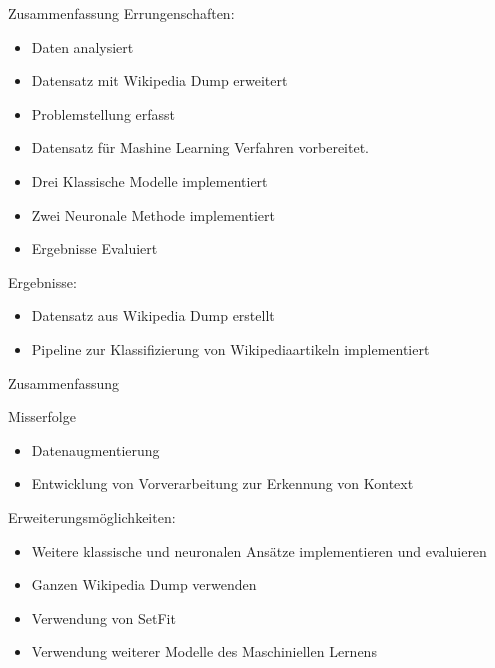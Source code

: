 \documentclass[aspectratio=169]{beamer} %
\begin{document}
\begin{frame}
\begin{block}{Zusammenfassung}
Errungenschaften:
\begin{itemize}
\item Daten analysiert
\item Datensatz mit Wikipedia Dump erweitert
\item Problemstellung erfasst
\item Datensatz für Mashine Learning Verfahren vorbereitet.
\item Drei Klassische Modelle implementiert
\item Zwei Neuronale Methode implementiert
\item Ergebnisse Evaluiert
\end{itemize}
Ergebnisse:
\begin{itemize}
\item Datensatz aus Wikipedia Dump erstellt
\item Pipeline zur Klassifizierung von Wikipediaartikeln implementiert
\end{itemize}
\end{block}
\end{frame}
\begin{frame}

\begin{block}{Zusammenfassung}

Misserfolge
\begin{itemize}
\item Datenaugmentierung
\item Entwicklung von Vorverarbeitung zur Erkennung von Kontext
\end{itemize}
Erweiterungsmöglichkeiten:
\begin{itemize}
\item Weitere klassische und neuronalen Ansätze implementieren und evaluieren
\item Ganzen Wikipedia Dump verwenden
\item Verwendung von SetFit
\item Verwendung weiterer Modelle des Maschiniellen Lernens
\end{itemize}
\end{block}
\end{frame}
\end{document}
